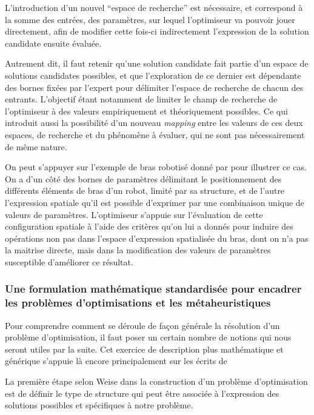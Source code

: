 L'introduction d'un nouvel \enquote{espace de recherche} est nécessaire, et  correspond à la somme des entrées, des paramètres, sur lequel l'optimiseur va pouvoir jouer directement, afin de modifier cette fois-ci indirectement l'expression de la solution candidate ensuite évaluée.

Autrement dit, il faut retenir qu'une solution candidate fait partie d'un espace de solutions candidates possibles, et que l'exploration de ce dernier est dépendante des bornes fixées par l'expert pour délimiter l'espace de recherche de chacun des entrants. L'objectif étant notamment de limiter le champ de recherche de l'optimiseur à des valeurs empiriquement et théoriquement possibles. Ce qui introduit aussi la possibilité d'un nouveau \textit{mapping} entre les valeurs de ces deux espaces, de recherche et du phénomène à évaluer, qui ne sont pas nécessairement de même nature.

On peut s'appuyer sur l'exemple de bras robotisé donné par \autocite{Weise2011} pour illustrer ce cas. On a d'un côté des bornes de paramètres délimitant le positionnement des différents éléments de bras d'un robot, limité par sa structure, et de l'autre l'expression spatiale qu'il est possible d'exprimer par une combinaison unique de valeurs de paramètres. L'optimiseur s'appuie sur l'évaluation de cette configuration spatiale à l'aide des critères qu'on lui a donnés pour induire des opérations non pas dans l'espace d'expression spatialisée du bras, dont on n'a pas la maitrise directe, mais dans la modification des valeurs de paramètres susceptible d'améliorer ce résultat.

\subsubsection{Une formulation mathématique standardisée pour encadrer les problèmes d'optimisations et les métaheuristiques}
\label{sssec:math_opti}


Pour comprendre comment se déroule de façon générale la résolution d'un problème d'optimisation, il faut poser un certain nombre de notions qui nous seront utiles par la suite. Cet exercice de description plus mathématique et générique s'appuie là encore principalement sur les écrits de \textcite{Weise2011}

La première étape selon Weise dans la construction d'un problème d'optimisation est de définir le type de structure qui peut être associée à l'expression des solutions possibles et spécifiques à notre problème.

